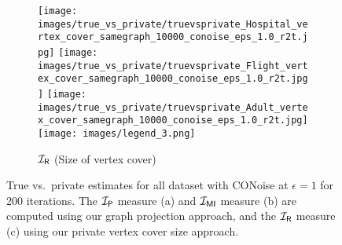 \begin{figure*}
\begin{subfigure}[b]{\textwidth}
    \hfill
    \texttt{[image: images/true\_vs\_private/truevsprivate\_Hospital\_vertex\_cover\_samegraph\_10000\_conoise\_eps\_1.0\_r2t.jpg]}
    \hfill
    \texttt{[image: images/true\_vs\_private/truevsprivate\_Flight\_vertex\_cover\_samegraph\_10000\_conoise\_eps\_1.0\_r2t.jpg]}
    \hfill
    \texttt{[image: images/true\_vs\_private/truevsprivate\_Adult\_vertex\_cover\_samegraph\_10000\_conoise\_eps\_1.0\_r2t.jpg]}
    \texttt{[image: images/legend\_3.png]}
    \caption{$\mathcal{I_\mathsf{R}}$ (Size of vertex cover)}
    \label{fig:tp_conoise_vcover}
\end{subfigure}
     \caption{True vs.~private estimates for all dataset with CONoise at $\epsilon = 1$ for 200 iterations. The $\mathcal{I_\mathsf{P}}$ measure (a) and $\mathcal{I_{\mathsf{MI}}}$ measure (b) are computed using our graph projection approach, and the $\mathcal{I_\mathsf{R}}$ measure (c) using our private vertex cover size approach.}
     \label{fig:tp_conoise}
\end{figure*}




